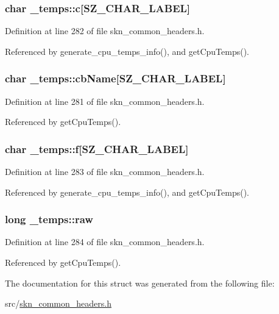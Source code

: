 \subsubsection[{c}]{\setlength{\rightskip}{0pt plus 5cm}char \+\_\+temps\+::c\mbox{[}{\bf S\+Z\+\_\+\+C\+H\+A\+R\+\_\+\+L\+A\+B\+E\+L}\mbox{]}}\label{struct__temps_add683444c2985b00bd51bc69e9026a69}


Definition at line 282 of file skn\+\_\+common\+\_\+headers.\+h.



Referenced by generate\+\_\+cpu\+\_\+temps\+\_\+info(), and get\+Cpu\+Temps().

\hypertarget{struct__temps_a74414216b43459f4ebcada36b9b165f5}{}
\subsubsection[{cb\+Name}]{\setlength{\rightskip}{0pt plus 5cm}char \+\_\+temps\+::cb\+Name\mbox{[}{\bf S\+Z\+\_\+\+C\+H\+A\+R\+\_\+\+L\+A\+B\+E\+L}\mbox{]}}\label{struct__temps_a74414216b43459f4ebcada36b9b165f5}


Definition at line 281 of file skn\+\_\+common\+\_\+headers.\+h.



Referenced by get\+Cpu\+Temps().

\hypertarget{struct__temps_a9de7d7f00c6df40b61735f25e3247b40}{}
\subsubsection[{f}]{\setlength{\rightskip}{0pt plus 5cm}char \+\_\+temps\+::f\mbox{[}{\bf S\+Z\+\_\+\+C\+H\+A\+R\+\_\+\+L\+A\+B\+E\+L}\mbox{]}}\label{struct__temps_a9de7d7f00c6df40b61735f25e3247b40}


Definition at line 283 of file skn\+\_\+common\+\_\+headers.\+h.



Referenced by generate\+\_\+cpu\+\_\+temps\+\_\+info(), and get\+Cpu\+Temps().

\hypertarget{struct__temps_a62d3522782b91f7fbb444bceb91c1876}{}
\subsubsection[{raw}]{\setlength{\rightskip}{0pt plus 5cm}long \+\_\+temps\+::raw}\label{struct__temps_a62d3522782b91f7fbb444bceb91c1876}


Definition at line 284 of file skn\+\_\+common\+\_\+headers.\+h.



Referenced by get\+Cpu\+Temps().



The documentation for this struct was generated from the following file\+:\begin{DoxyCompactItemize}
\item 
src/\hyperlink{skn__common__headers_8h}{skn\+\_\+common\+\_\+headers.\+h}\end{DoxyCompactItemize}
